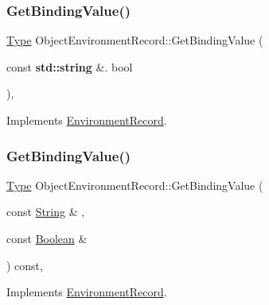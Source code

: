 \subsubsection{\texorpdfstring{Get\+Binding\+Value()}{GetBindingValue()}\hspace{0.1cm}{\footnotesize\ttfamily [1/2]}}
{\footnotesize\ttfamily \hyperlink{class_type}{Type} Object\+Environment\+Record\+::\+Get\+Binding\+Value (\begin{DoxyParamCaption}\item[{const \textbf{ std\+::string} \&.}]{bool }\end{DoxyParamCaption})\hspace{0.3cm}{\ttfamily [final]}, {\ttfamily [virtual]}}



Implements \hyperlink{struct_environment_record_afd78e04157f5d84cac025d2b0c867b4e}{Environment\+Record}.

\mbox{\label{struct_object_environment_record_a8b7aabb730c9d2bd738f32b4a36e6bf4}} 
\subsubsection{\texorpdfstring{Get\+Binding\+Value()}{GetBindingValue()}\hspace{0.1cm}{\footnotesize\ttfamily [2/2]}}
{\footnotesize\ttfamily \hyperlink{class_type}{Type} Object\+Environment\+Record\+::\+Get\+Binding\+Value (\begin{DoxyParamCaption}\item[{const \hyperlink{struct_string}{String} \&}]{,  }\item[{const \hyperlink{struct_boolean}{Boolean} \&}]{ }\end{DoxyParamCaption}) const\hspace{0.3cm}{\ttfamily [final]}, {\ttfamily [virtual]}}



Implements \hyperlink{struct_environment_record_a38f1293eb4b23d22c0ee37ffff58dbdb}{Environment\+Record}.

\mbox{\label{struct_object_environment_record_a02908375958d95ff57da4f24572949f4}} 
